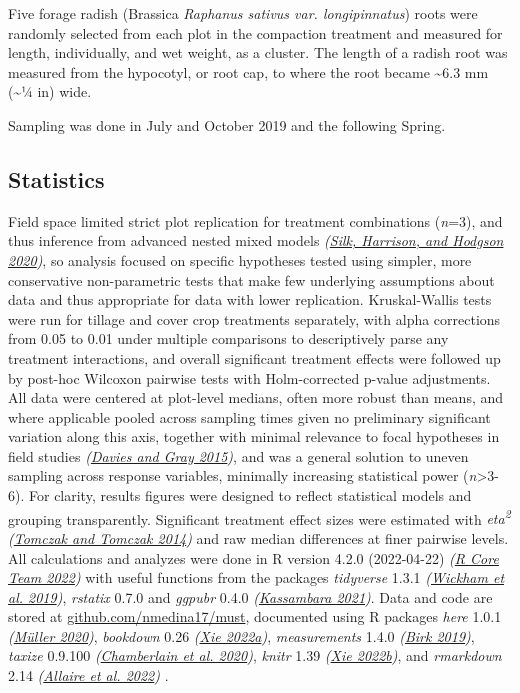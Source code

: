 \documentclass[
]{article}
\begin{document}
Five forage radish (Brassica \emph{Raphanus sativus var. longipinnatus}) roots were randomly selected from each plot in the compaction treatment and measured for length, individually, and wet weight, as a cluster.
The length of a radish root was measured from the hypocotyl, or root cap, to where the root became \textasciitilde6.3 mm (\textasciitilde1⁄4 in) wide.

Sampling was done in July and October 2019 and the following Spring.

\hypertarget{statistics}{%
\subsection{Statistics}\label{statistics}}

Field space limited strict plot replication for treatment combinations (\emph{n}=3), and thus inference from advanced nested mixed models \emph{(\protect\hyperlink{ref-silk20}{Silk, Harrison, and Hodgson 2020})}, so analysis focused on specific hypotheses tested using simpler, more conservative non-parametric tests that make few underlying assumptions about data and thus appropriate for data with lower replication.
Kruskal-Wallis tests were run for tillage and cover crop treatments separately, with alpha corrections from 0.05 to 0.01 under multiple comparisons to descriptively parse any treatment interactions, and overall significant treatment effects were followed up by post-hoc Wilcoxon pairwise tests with Holm-corrected p-value adjustments.
All data were centered at plot-level medians, often more robust than means, and where applicable pooled across sampling times given no preliminary significant variation along this axis, together with minimal relevance to focal hypotheses in field studies \emph{(\protect\hyperlink{ref-davies15b}{Davies and Gray 2015})}, and was a general solution to uneven sampling across response variables, minimally increasing statistical power (\emph{n}\textgreater3-6).
For clarity, results figures were designed to reflect statistical models and grouping transparently.
Significant treatment effect sizes were estimated with \emph{eta\textsuperscript{2}} \emph{(\protect\hyperlink{ref-tomczak14}{Tomczak and Tomczak 2014})} and raw median differences at finer pairwise levels.
All calculations and analyzes were done in R version 4.2.0 (2022-04-22) \emph{(\protect\hyperlink{ref-base}{R Core Team 2022})} with useful functions from the packages \emph{tidyverse} 1.3.1 \emph{(\protect\hyperlink{ref-tidyverse}{Wickham et al. 2019})}, \emph{rstatix} 0.7.0 and \emph{ggpubr} 0.4.0 \emph{(\protect\hyperlink{ref-rstatix}{Kassambara 2021})}.
Data and code are stored at \url{github.com/nmedina17/must},
documented using R packages
\emph{here} 1.0.1 \emph{(\protect\hyperlink{ref-here}{Müller 2020})},
\emph{bookdown} 0.26 \emph{(\protect\hyperlink{ref-bookdown2022}{Xie 2022a})},
\emph{measurements} 1.4.0 \emph{(\protect\hyperlink{ref-measurements}{Birk 2019})},
\emph{taxize} 0.9.100 \emph{(\protect\hyperlink{ref-taxize2020}{Chamberlain et al. 2020})},
\emph{knitr} 1.39 \emph{(\protect\hyperlink{ref-knitr2022}{Xie 2022b})}, and
\emph{rmarkdown} 2.14 \emph{(\protect\hyperlink{ref-rmarkdown2022}{Allaire et al. 2022})}
.
\end{document}
